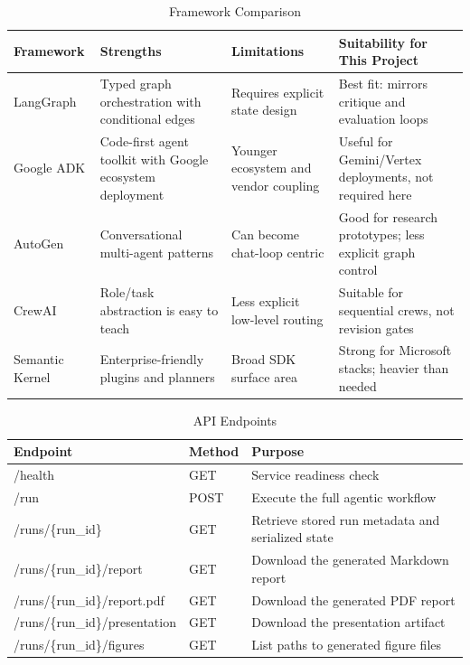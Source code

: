 \documentclass[11pt]{article}
\begin{document}
\begin{table}[!htbp]
\centering
\caption{Framework Comparison}
\label{tab:state-table-2}
\begingroup
\scriptsize
\setlength{\tabcolsep}{2.8pt}
\renewcommand{\arraystretch}{1.35}
\begin{adjustbox}{max width=\textwidth}
\begin{tabularx}{\textwidth}{@{}>{\RaggedRight\arraybackslash}p{}YYY@{}}
\toprule
\textbf{Framework} & \textbf{Strengths} & \textbf{Limitations} & \textbf{Suitability for This Project} \\
\midrule
LangGraph & Typed graph orchestration with conditional edges & Requires explicit state design & Best fit: mirrors critique and evaluation loops \\
Google ADK & Code-first agent toolkit with Google ecosystem deployment & Younger ecosystem and vendor coupling & Useful for Gemini/Vertex deployments, not required here \\
AutoGen & Conversational multi-agent patterns & Can become chat-loop centric & Good for research prototypes; less explicit graph control \\
CrewAI & Role/task abstraction is easy to teach & Less explicit low-level routing & Suitable for sequential crews, not revision gates \\
Semantic Kernel & Enterprise-friendly plugins and planners & Broad SDK surface area & Strong for Microsoft stacks; heavier than needed \\
\bottomrule
\end{tabularx}
\end{adjustbox}
\endgroup
\end{table}
\FloatBarrier


\begin{table}[!htbp]
\centering
\caption{API Endpoints}
\label{tab:state-table-3}
\begingroup
\footnotesize
\setlength{\tabcolsep}{2.8pt}
\renewcommand{\arraystretch}{1.35}
\begin{adjustbox}{max width=\textwidth}
\begin{tabularx}{\textwidth}{@{}>{\RaggedRight\arraybackslash}p{}>{\RaggedRight\arraybackslash}p{}Y@{}}
\toprule
\textbf{Endpoint} & \textbf{Method} & \textbf{Purpose} \\
\midrule
/health & GET & Service readiness check \\
/run & POST & Execute the full agentic workflow \\
/runs/\{run\_id\} & GET & Retrieve stored run metadata and serialized state \\
/runs/\{run\_id\}/report & GET & Download the generated Markdown report \\
/runs/\{run\_id\}/report.pdf & GET & Download the generated PDF report \\
/runs/\{run\_id\}/presentation & GET & Download the presentation artifact \\
/runs/\{run\_id\}/figures & GET & List paths to generated figure files \\
\bottomrule
\end{tabularx}
\end{adjustbox}
\endgroup
\end{table}
\FloatBarrier
\end{document}
